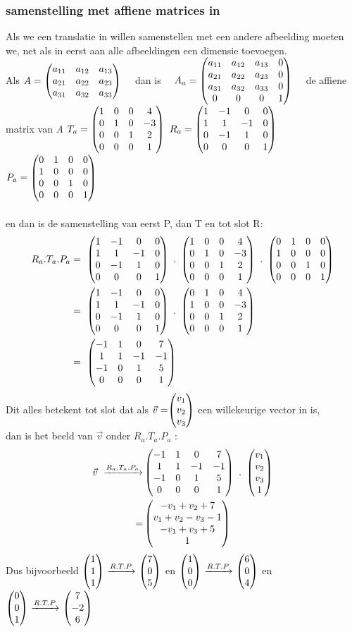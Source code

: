 \documentclass[hidelinks, a4wide, 12pt,  twoside]{book}
\begin{document}
\subsubsection{samenstelling met affiene matrices in \RD}
Als we een translatie in \RD willen samenstellen met een andere afbeelding moeten we, net als in \RT eerst aan alle afbeeldingen een dimensie toevoegen. \\ 
 {
	Als $ 	A = \begin{pmatrix} {}a_{11} & a_{12} & a_{13}  \\  a_{21} & a_{22}  &  a_{23} \\  a_{31} & a_{32} & a_{33} \end{pmatrix} $ \ \ 
	dan is \ \ 
	$  
	A_a = \begin{pmatrix} a_{11} & a_{12} & a_{13} & 0  \\  a_{21} & a_{22}  & a_{23} & 0  \\  a_{31} & a_{32} & a_{33} & 0 \\ 0 & 0 & 0 & 1  \end{pmatrix}  $ \ \  de affiene matrix van\textit{ A} } 
$ T_a = \begin{pmatrix}  1 & 0 & 0 & 4  \\  0 & 1 & 0 &-3  \\  0 & 0 & 1 & 2 \\ 0 & 0 & 0 & 1  \end{pmatrix} $  \qquad
$ R_a = \begin{pmatrix}  1 & -1 & 0 & 0  \\  1 & 1 & -1 & 0 \\  0 & -1 & 1  & 0 \\ 0 & 0 & 0 & 1  \end{pmatrix} $ \qquad
$ P_a = \begin{pmatrix}  0 & 1 & 0  & 0  \\  1 & 0 & 0 & 0  \\  0 & 0 & 1  & 0  \\ 0 & 0 & 0 & 1  \end{pmatrix} $ \\ \\
en dan is de samenstelling van eerst P, dan T en tot slot R:
\begin{align*} 
R_a . T_a . P_a & = \ 
\matvier{ 1 & -1 & 0 & 0 }
{ 1 & 1 & -1 & 0}
{ 0 & -1 & 1  & 0}
{0 & 0 & 0 & 1 }  \ . \ 
\matvier{ 1 & 0 & 0 & 4 }
{ 0 & 1 & 0 &-3 }
{ 0 & 0 & 1 & 2}
{0 & 0 & 0 & 1 }  \ . \ 
\matvier{ 0 & 1 & 0  & 0 }  
{ 1 & 0 & 0 & 0 }
{ 0 & 0 & 1  & 0 } 
{0 & 0 & 0 & 1 }  \\
& = \ \matvier { 1 & -1 & 0 & 0 }
{ 1 & 1 & -1 & 0}
{ 0 & -1 & 1  & 0}
{0 & 0 & 0 & 1 }  \ . \ 
\matvier{ 0 & 1 & 0 & 4 }
{ 1 & 0 & 0 &-3 }
{ 0 & 0 & 1 & 2}
{0 & 0 & 0 & 1 }   \\
& = \ \matvier{ -1 & 1 & 0 & 7 }
{ 1 & 1 & -1 & -1 }
{ -1 & 0 & 1 & 5}
{0 & 0 & 0 & 1 }  
\end{align*} 
Dit alles betekent tot slot dat als $\vec{v} = \vecdriesnel{v} $ een willekeurige vector in \RD is, \\dan is  het beeld van $ \vec{v} $ onder $  R_a. T_a . P_a $ :
\begin{align*} 
\vec{v}  \  \xrightarrow{R_a. T_a . P_a}   
&   \matvier{ -1 & 1 & 0 & 7 }
{ 1 & 1 & -1 & -1 }
{ -1 & 0 & 1 & 5}
{0 & 0 & 0 & 1 }  \ . \ 
\matvier{v_1}{v_2}{v_3}{1}  \\ 
=  & \matvier {-v_1+v_2+7} 
{ v_1+v_2-v_3 -1 }
{-v_1+v_3+ 5} {1} 
\end{align*}                        
Dus bijvoorbeeld $ \vecdrie{1}{1}{1}  \  \xrightarrow{R. T . P} \  \vecdrie{7}{0}{5}    $ \quad en  \quad 
$ \vecdrie{1}{0}{0}  \  \xrightarrow{R. T . P}  \ \vecdrie{6}{0}{4}  $ 
\quad en  \quad 
$ \vecdrie{0}{0}{1}  \  \xrightarrow{R. T . P}  \ \vecdrie{7}{-2}{6}  $ 
\end{document}
